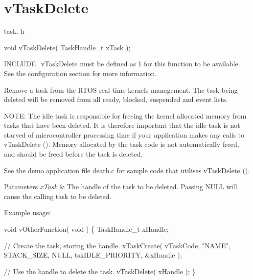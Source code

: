 \hypertarget{group__v_task_delete}{}\section{v\+Task\+Delete}
\label{group__v_task_delete}
task. h 
\begin{DoxyPre}
void \hyperlink{externals_2freertos_2include_2task_8h_a27ff4ebce26565bef136bda84201ff80}{vTaskDelete( TaskHandle\_t xTask )};
\end{DoxyPre}


I\+N\+C\+L\+U\+D\+E\+\_\+v\+Task\+Delete must be defined as 1 for this function to be available. See the configuration section for more information.

Remove a task from the R\+T\+OS real time kernel\textquotesingle{}s management. The task being deleted will be removed from all ready, blocked, suspended and event lists.

N\+O\+TE\+: The idle task is responsible for freeing the kernel allocated memory from tasks that have been deleted. It is therefore important that the idle task is not starved of microcontroller processing time if your application makes any calls to v\+Task\+Delete (). Memory allocated by the task code is not automatically freed, and should be freed before the task is deleted.

See the demo application file death.\+c for sample code that utilises v\+Task\+Delete ().


\begin{DoxyParams}{Parameters}
{\em x\+Task} & The handle of the task to be deleted. Passing N\+U\+LL will cause the calling task to be deleted.\\
\hline
\end{DoxyParams}
Example usage\+: 
\begin{DoxyPre}
void vOtherFunction( void )
\{
TaskHandle\_t xHandle;\end{DoxyPre}



\begin{DoxyPre}  // Create the task, storing the handle.
  xTaskCreate( vTaskCode, "NAME", STACK\_SIZE, NULL, tskIDLE\_PRIORITY, \&xHandle );\end{DoxyPre}



\begin{DoxyPre}  // Use the handle to delete the task.
  vTaskDelete( xHandle );
\}
\end{DoxyPre}


